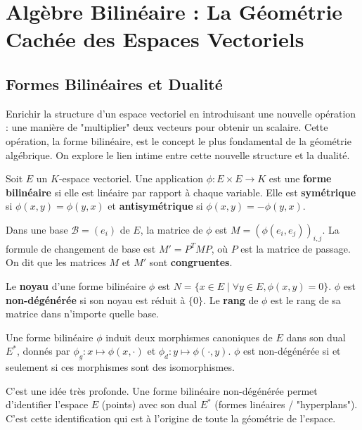 \chapter{Algèbre Bilinéaire : La Géométrie Cachée des Espaces Vectoriels}

\section{Formes Bilinéaires et Dualité}

\begin{objectif}
    Enrichir la structure d'un espace vectoriel en introduisant une nouvelle opération : une manière de "multiplier" deux vecteurs pour obtenir un scalaire. Cette opération, la forme bilinéaire, est le concept le plus fondamental de la géométrie algébrique. On explore le lien intime entre cette nouvelle structure et la dualité.
\end{objectif}

\begin{definition}
    Soit $E$ un $K$-espace vectoriel. Une application $\phi: E \times E \to K$ est une \textbf{forme bilinéaire} si elle est linéaire par rapport à chaque variable.
    Elle est \textbf{symétrique} si $\phi(x,y)=\phi(y,x)$ et \textbf{antisymétrique} si $\phi(x,y)=-\phi(y,x)$.
\end{definition}

\begin{definition}
    Dans une base $\mathcal{B}=(e_i)$ de $E$, la matrice de $\phi$ est $M = (\phi(e_i, e_j))_{i,j}$. La formule de changement de base est $M' = P^T M P$, où $P$ est la matrice de passage. On dit que les matrices $M$ et $M'$ sont \textbf{congruentes}.
\end{definition}

\begin{definition}
    Le \textbf{noyau} d'une forme bilinéaire $\phi$ est $N = \{ x \in E \mid \forall y \in E, \phi(x,y)=0 \}$.
    $\phi$ est \textbf{non-dégénérée} si son noyau est réduit à $\{0\}$.
    Le \textbf{rang} de $\phi$ est le rang de sa matrice dans n'importe quelle base.
\end{definition}

\begin{proposition}
    Une forme bilinéaire $\phi$ induit deux morphismes canoniques de $E$ dans son dual $E^*$, donnés par $\phi_g: x \mapsto \phi(x, \cdot)$ et $\phi_d: y \mapsto \phi(\cdot, y)$.
    $\phi$ est non-dégénérée si et seulement si ces morphismes sont des isomorphismes.
\end{proposition}
\begin{remark}
    C'est une idée très profonde. Une forme bilinéaire non-dégénérée permet d'identifier l'espace $E$ (points) avec son dual $E^*$ (formes linéaires / "hyperplans"). C'est cette identification qui est à l'origine de toute la géométrie de l'espace.
\end{remark}


